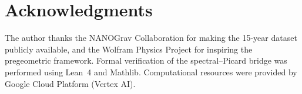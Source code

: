 \section*{Acknowledgments}
\label{sec:acknowledgments}

The author thanks the NANOGrav Collaboration for making the 15-year dataset publicly available, and the Wolfram Physics Project for inspiring the pregeometric framework.  Formal verification of the spectral--Picard bridge was performed using Lean~4 and Mathlib.  Computational resources were provided by Google Cloud Platform (Vertex AI).
